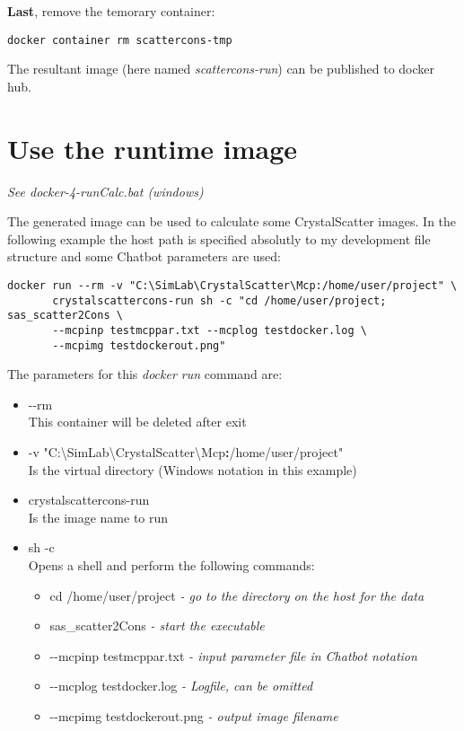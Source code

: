 \documentclass[11pt]{article} %
\begin{document}
{\bf Last}, remove the temorary container:
\begin{lstlisting}[frame=single]
docker container rm scattercons-tmp
\end{lstlisting}
The resultant image (here named {\it scattercons-run}) can be published to docker hub.


\section{Use the runtime image}

\centerline{\it See docker-4-runCalc.bat (windows)}

The generated image can be used to calculate some CrystalScatter images. In the following example the host path is specified absolutly to my development file structure and some Chatbot parameters are used:
\begin{lstlisting}[frame=single]
docker run --rm -v "C:\SimLab\CrystalScatter\Mcp:/home/user/project" \
       crystalscattercons-run sh -c "cd /home/user/project; sas_scatter2Cons \
       --mcpinp testmcppar.txt --mcplog testdocker.log \
       --mcpimg testdockerout.png"
\end{lstlisting}
The parameters for this {\it docker run} command are:
\begin{itemize}\itemsep0pt
\item -{}-rm \\
	This container will be deleted after exit
\item -v "C:{\textbackslash}SimLab{\textbackslash}CrystalScatter{\textbackslash}Mcp{\bf :}/home/user/project" \\
	Is the virtual directory (Windows notation in this example)
\item crystalscattercons-run \\
	Is the image name to run
\item sh -c \\
	Opens a shell and perform the following commands:
	\begin{itemize}[*]\itemsep0pt
	\item cd /home/user/project {\it - go to the directory on the host for the data}
	\item sas\_scatter2Cons {\it - start the executable}
	\item -{}-mcpinp testmcppar.txt {\it - input parameter file in Chatbot notation}
	\item -{}-mcplog testdocker.log {\it - Logfile, can be omitted}
	\item -{}-mcpimg testdockerout.png {\it - output image filename}
	\end{itemize}
\end{itemize}
\end{document}
